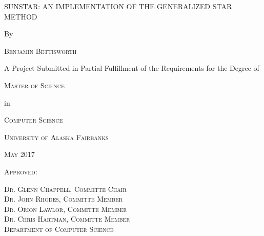 \documentclass[12pt]{report}
\begin{document}
\begin{titlepage}
    \centering
    \doublespacing
    {\scshape\LARGE SUNSTAR: AN IMPLEMENTATION OF THE GENERALIZED STAR METHOD \par}
    {By\par}
    {\scshape\Large Benjamin Bettisworth\par}
    \vspace{1.5cm}
    {A Project Submitted in Partial Fulfillment of the Requirements for the
        Degree of\par}
    \vspace{1cm}
    {\textsc{Master of Science}\par}
    {in \par}
    {\textsc{Computer Science}\par}
    \vspace{1cm}
    {\textsc{University of Alaska Fairbanks}\par}
    {\textsc{May 2017}\par}
    \vfill
    {\textsc{Approved:}}
    \raggedleft
    \begin{minipage}[t]{.60\textwidth}
        \singlespacing
        \footnotesize\textsc{Dr. Glenn Chappell, Committe Chair}\\
        \footnotesize\textsc{Dr. John Rhodes, Committe Member}\\
        \footnotesize\textsc{Dr. Orion Lawlor, Committe Member}\\
        \footnotesize\textsc{Dr. Chris Hartman, Committe Member}\\
        \noindent{\phantom{a}}\hfill\textsc{Department of Computer Science}
    \end{minipage}
\end{titlepage}
\end{document}
